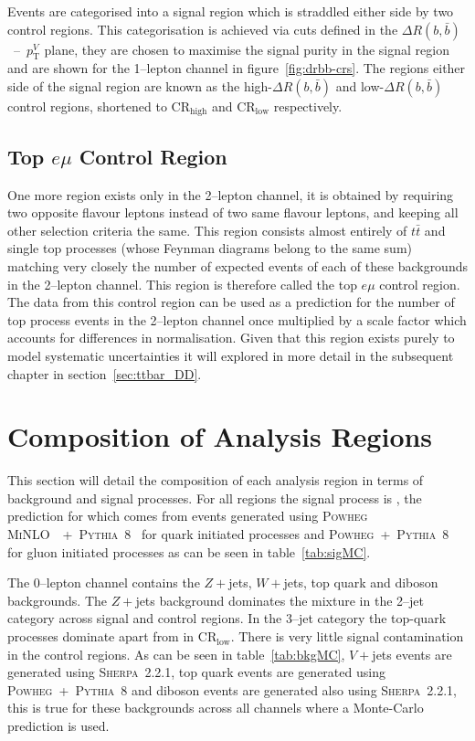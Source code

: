 Events are categorised into a signal region which is straddled either side by
two control regions. This categorisation is achieved via cuts defined in the
$\Delta R(b, \bar{b})$~--~$p_{\mathrm{T}}^{V}$ plane, they are chosen to
maximise the signal purity in the signal region and are shown for the 1--lepton
channel in figure~\ref{fig:drbb-crs}.  The
regions either side of the signal region are known as the high-$\Delta R(b,
\bar{b})$ and low-$\Delta R(b, \bar{b})$ control regions, shortened to
CR$_{\text{high}}$ and CR$_{\text{low}}$ respectively.

\subsection{Top \texorpdfstring{$e \mu$}{e mu} Control Region}%
\label{sec:topemucr}

One more region exists only in the 2--lepton channel, it is obtained by
requiring two opposite flavour leptons instead of two same flavour leptons, and
keeping all other selection criteria the same. This region consists almost
entirely of $t\bar{t}$ and single top processes (whose Feynman diagrams belong
to the same sum) matching very closely the number of expected events of each of
these backgrounds in the 2--lepton channel. This region is therefore called the
top $e \mu$ control region. The data from this control region can be used as a
prediction for the number of top process events in the 2--lepton channel once
multiplied by a scale factor which accounts for differences in normalisation.
Given that this region exists purely to model systematic uncertainties it will
explored in more detail in the subsequent chapter in section~\ref{sec:ttbar_DD}.

\section{Composition of Analysis Regions}
\label{sec:composition}

This section will detail the composition of each analysis region in terms of
background and signal processes. For all regions the signal process is \VHbb,
the prediction for which comes from events generated using \textsc{Powheg
MiNLO}~\cite{Luisoni2013}~+~\textsc{Pythia~8}~\cite{pythia8} for quark initiated
processes and \textsc{Powheg}~+~\textsc{Pythia~8} for gluon initiated processes
as can be seen in table~\ref{tab:sigMC}. 

The 0--lepton channel contains the $Z + $jets, $W+$jets, top quark and diboson
backgrounds. The $Z+$jets background dominates the mixture in the 2--jet
category across signal and control regions. In the 3--jet category the top-quark
processes dominate apart from in CR$_{\text{low}}$. There is very little signal
contamination in the control regions. As can be seen in table~\ref{tab:bkgMC},
$V+$jets events are generated using \textsc{Sherpa~2.2.1}, top quark events are
generated using \textsc{Powheg}~+~\textsc{Pythia~8} and diboson events are
generated also using \textsc{Sherpa~2.2.1}, this is true for these backgrounds
across all channels where a Monte-Carlo prediction is used.


